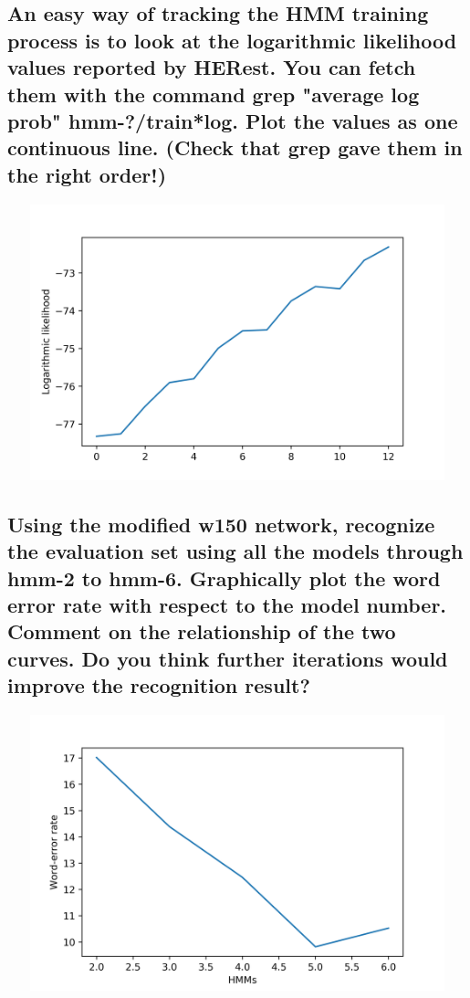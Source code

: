 \documentclass[17pt]{article}
\begin{document}
\subsection{An easy way of tracking the HMM training process is to look at the logarithmic likelihood values reported by HERest. You can fetch them with the command grep "average log prob" hmm-?/train*log. Plot the values as one continuous line. (Check that grep gave them in the right order!)}

\begin{center}
\includegraphics[width=15cm, height=8cm]{likelihood.png}
\end{center}

\subsection{Using the modified w150 network, recognize the evaluation set using all the models through hmm-2 to hmm-6. Graphically plot the word error rate with respect to the model number. Comment on the relationship of the two curves. Do you think further iterations would improve the recognition result?}

\begin{center}
\includegraphics[width=15cm, height=8cm]{word_error_rate.png}
\end{center}
\end{document}
